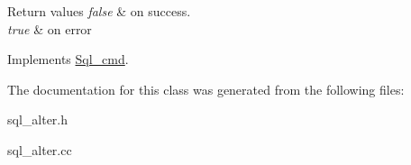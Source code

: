 \begin{DoxyRetVals}{Return values}
{\em false} & on success. \\
\hline
{\em true} & on error \\
\hline
\end{DoxyRetVals}


Implements \mbox{\hyperlink{classSql__cmd_a213367b79b551296fbb7790f2a3732fb}{Sql\+\_\+cmd}}.



The documentation for this class was generated from the following files\+:\begin{DoxyCompactItemize}
\item 
sql\+\_\+alter.\+h\item 
sql\+\_\+alter.\+cc\end{DoxyCompactItemize}
